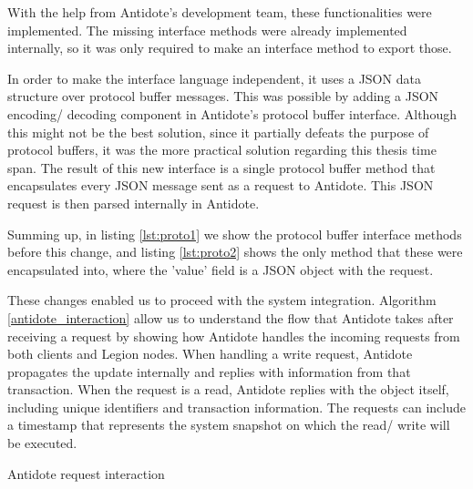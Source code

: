 \par
	With the help from Antidote's development team, these functionalities were implemented. The missing interface methods were already implemented internally, so it was only required to make an interface method to export those.\par
	In order to make the interface language independent, it uses a JSON data structure over protocol buffer messages. This was possible by adding a JSON encoding/ decoding component in Antidote's protocol buffer interface. Although this might not be the best solution, since it partially defeats the purpose of protocol buffers, it was the more practical solution regarding this thesis time span. The result of this new interface is a single protocol buffer method that encapsulates every JSON message sent as a request to Antidote. This JSON request is then parsed internally in Antidote.\par
	Summing up, in listing \ref{lst:proto1} we show the protocol buffer interface methods before this change, and listing \ref{lst:proto2} shows the only method that these were encapsulated into, where the 'value' field is a JSON object with the request.\par
	These changes enabled us to proceed with the system integration. Algorithm \ref{antidote_interaction} allow us to understand the flow that Antidote takes after receiving a request by showing how Antidote handles the incoming requests from both clients and Legion nodes. When handling a write request, Antidote propagates the update internally and replies with information from that transaction. When the request is a read, Antidote replies with the object itself, including unique identifiers and transaction information. The requests can include a timestamp that represents the system snapshot on which the read/ write will be executed.
	
\begin{algorithm}[H]
\caption{Antidote request interaction}\label{antidote_interaction}
\begin{algorithmic}[1]
    \End
    \End
      \EndIf
    \End
    \End
    \End
  \End
\End
\end{algorithmic}
\end{algorithm}

